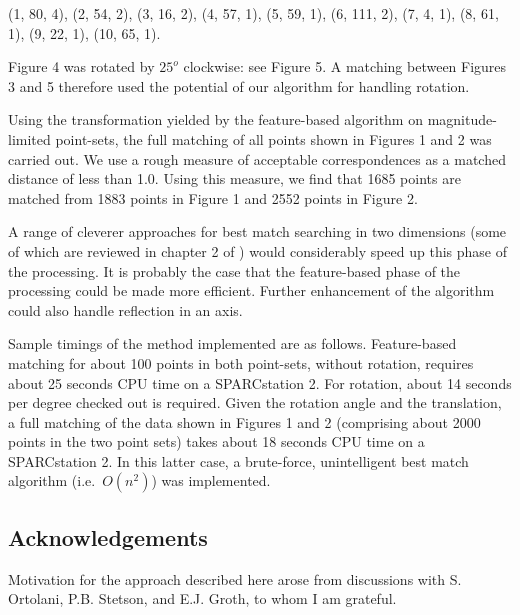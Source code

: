 (1, 80, 4), (2, 54, 2), (3, 16, 2), (4, 57, 1), (5, 59, 1), (6, 111, 2),
(7, 4, 1), (8, 61, 1), (9, 22, 1), (10, 65, 1).

Figure 4 was rotated by $25^o$ clockwise: see Figure 5.  
A matching between Figures 3 
and 5 therefore used the potential of our algorithm for handling rotation.

Using the transformation yielded by the feature-based 
algorithm on magn\-itude-limited 
point-sets, the full matching of all points shown in Figures 1 and 2 was 
carried out.  We use a rough measure of acceptable correspondences as a 
matched distance of less than 1.0.  Using this measure, we find that
1685 points are matched from 1883 points in Figure 1 and 2552 points in 
Figure 2.

A range of cleverer approaches for
best match searching in two dimensions (some of which are reviewed in chapter
2 of \cite{mur2}) would considerably speed up this phase of the processing.
It is probably the case that the feature-based phase of the
processing could be made more efficient.
Further enhancement of the algorithm could also handle 
reflection in an axis.

Sample timings of the method implemented are as follows.  Feature-based 
matching for about 100 points in both point-sets, without rotation, 
requires about 25 seconds CPU time on a SPARCstation 2.  For rotation, about
14 seconds per degree checked out is required.  Given the rotation angle and
the translation, a full matching of the data shown in Figures 
1 and 2 (comprising
about 2000 points in the two point sets) takes about 18 seconds CPU time on
a SPARCstation 2.  In this latter case, a brute-force, unintelligent
best match algorithm (i.e.\ $O(n^2)$) was 
implemented.  

\subsection*{Acknowledgements}
Motivation for the approach described here arose from discussions with
S. Ortolani, P.B. Stetson, and E.J. Groth, to whom I am grateful.

